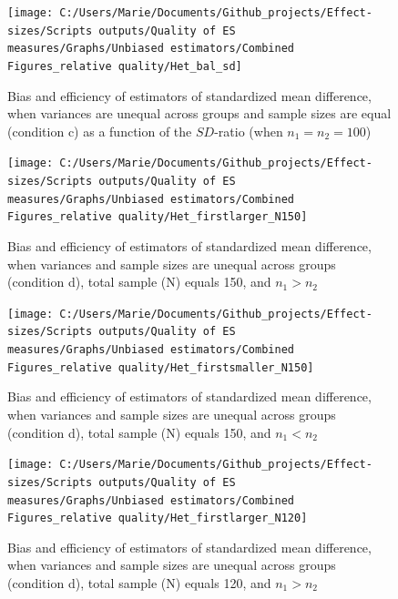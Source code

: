 \documentclass[
  man,floatsintext]{apa6}
\begin{document}
\begin{figure}

{\centering \texttt{[image: C:/Users/Marie/Documents/Github\_projects/Effect-sizes/Scripts outputs/Quality of ES measures/Graphs/Unbiased estimators/Combined Figures\_relative quality/Het\_bal\_sd]} 

}

\caption{Bias and efficiency of estimators of standardized mean difference, when variances are unequal across groups and sample sizes are equal (condition c) as a function of the $SD$-ratio (when $n_1=n_2=100$)}\label{fig:idHetbal2}
\end{figure}

\begin{figure}

{\centering \texttt{[image: C:/Users/Marie/Documents/Github\_projects/Effect-sizes/Scripts outputs/Quality of ES measures/Graphs/Unbiased estimators/Combined Figures\_relative quality/Het\_firstlarger\_N150]} 

}

\caption{Bias and efficiency of estimators of standardized mean difference, when variances and sample sizes are unequal across groups (condition d), total sample (N) equals 150, and $n_1>n_2$}\label{fig:idHetunbal1}
\end{figure}

\begin{figure}

{\centering \texttt{[image: C:/Users/Marie/Documents/Github\_projects/Effect-sizes/Scripts outputs/Quality of ES measures/Graphs/Unbiased estimators/Combined Figures\_relative quality/Het\_firstsmaller\_N150]} 

}

\caption{Bias and efficiency of estimators of standardized mean difference, when variances and sample sizes are unequal across groups (condition d), total sample (N) equals 150, and $n_1<n_2$}\label{fig:idHetunbal2}
\end{figure}

\begin{figure}

{\centering \texttt{[image: C:/Users/Marie/Documents/Github\_projects/Effect-sizes/Scripts outputs/Quality of ES measures/Graphs/Unbiased estimators/Combined Figures\_relative quality/Het\_firstlarger\_N120]} 

}

\caption{Bias and efficiency of estimators of standardized mean difference, when variances and sample sizes are unequal across groups (condition d), total sample (N) equals 120, and $n_1>n_2$}\label{fig:idHetunbal3}
\end{figure}
\end{document}
